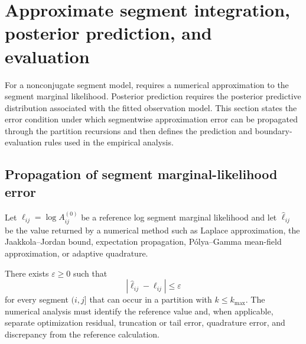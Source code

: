 \section{Approximate segment integration, posterior prediction, and evaluation}
\label{sec:approx-predict}

For a nonconjugate segment model, \BayesBreak requires a numerical approximation to the segment marginal likelihood. Posterior prediction requires the posterior predictive distribution associated with the fitted observation model. This section states the error condition under which segmentwise approximation error can be propagated through the partition recursions and then defines the prediction and boundary-evaluation rules used in the empirical analysis.

\subsection{Propagation of segment marginal-likelihood error}
Let $\ell_{ij}=\log A^{(0)}_{ij}$ be a reference log segment marginal likelihood and let $\widehat\ell_{ij}$ be the value returned by a numerical method such as Laplace approximation, the Jaakkola--Jordan bound, expectation propagation, P\'olya--Gamma mean-field approximation, or adaptive quadrature.

\begin{assumption}
\label{ass:block-error}
There exists $\varepsilon\ge0$ such that
\begin{equation}
 |\widehat\ell_{ij}-\ell_{ij}|\le\varepsilon
\label{eq:block-error}
\end{equation}
for every segment $(i,j]$ that can occur in a partition with $k\le k_{\max}$. The numerical analysis must identify the reference value and, when applicable, separate optimization residual, truncation or tail error, quadrature error, and discrepancy from the reference calculation.
\end{assumption}



